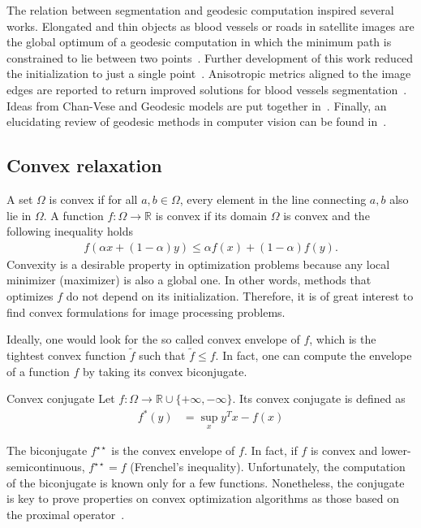 The relation between segmentation and geodesic computation inspired several works. Elongated and thin objects as blood vessels or roads in satellite images are the global optimum of a geodesic computation in which the minimum path is constrained to lie between two points~\cite{cohen97}. Further development of this work reduced the initialization to just a single point~\cite{benmansour09}. Anisotropic metrics aligned to the image edges are reported to return improved solutions for blood vessels segmentation~\cite{jbabdi08,benmansour11}. Ideas from Chan-Vese and Geodesic models are put together in~\cite{chen06}. Finally, an elucidating review of geodesic methods in computer vision can be found in~\cite{peyre10}.

\subsection{Convex relaxation}

A set $\Omega$ is convex if for all $a,b \in \Omega$, every element in the line connecting $a,b$ also lie in $\Omega$. A function $f:\Omega \rightarrow \mathbb{R}$  is convex if its domain $\Omega$ is convex and the following inequality holds
\begin{align*}
	f(\alpha x + (1-\alpha)y) \leq \alpha f(x) + (1-\alpha)f(y).
\end{align*}
%
Convexity is a desirable property in optimization problems because any local minimizer (maximizer) is also a global one. In other words, methods that optimizes $f$ do not depend on its initialization. Therefore, it is of great interest to find convex formulations for image processing problems.

Ideally, one would look for the so called convex envelope of $f$, which is the tightest convex function $\widetilde{f}$ such that $\widetilde{f} \leq f$. In fact, one can compute the envelope of a function $f$ by taking its convex biconjugate.
%
\begin{definition}{Convex conjugate}
	Let $f:\Omega \rightarrow \mathbb{R} \cup \{ +\infty, -\infty\}$. Its convex conjugate is defined as
	\begin{align*}
		f^{*}(y) &= \sup_x y^{T}x - f(x)
	\end{align*}
\end{definition}
%
The biconjugate $f^{\star \star}$ is the convex envelope of $f$. In fact, if $f$ is convex and lower-semicontinuous, $f^{\star \star}=f$ (Frenchel's inequality). Unfortunately, the computation of the biconjugate is known only for a few functions. Nonetheless, the conjugate is key to prove properties on convex optimization algorithms as those based on the proximal operator~\cite{chambolle04,beck09a}. 


